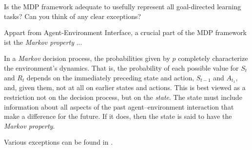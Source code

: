 
\begin{exercise}[Exercise 3.2]

Is the MDP framework adequate to usefully represent all goal-directed learning tasks?
Can you think of any clear exceptions?

\end{exercise}


\begin{solution}

Appart from Agent-Environment Interface, a crucial part of the MDP framework ist the \textit{Markov property} ...

\Quote
{
    In a \textit{Markov} decision process, the probabilities given by $p$ completely characterize the environment's dynamics.
    That is, the probability of each possible value for $S_t$ and $R_t$ depends on the immediately preceding state and action, $S_{t-1}$ and $A_{t_1}$, and, given them, not at all on earlier states and actions.
    This is best viewed as a restriction not on the decision process, but on the \textit{state}.
    The state must include information about all aspects of the past agent–environment interaction that make a difference for the future.
    If it does, then the state is said to have the \textit{Markov property}.
}
\cite*[page 49]{SuttonRichardS2018Rl:a}

Various exceptions can be found in \cite{WhiteheadStevenD1995Rlon}.

\end{solution}

